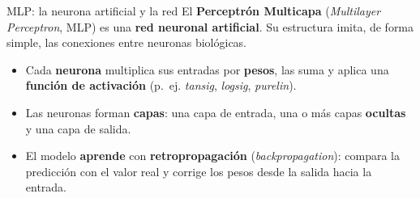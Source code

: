 \documentclass{beamer}
\begin{document}
\begin{frame}{MLP: la neurona artificial y la red}
    \justifying
    El \textbf{Perceptrón Multicapa} (\textit{Multilayer Perceptron}, MLP) es una \textbf{red neuronal artificial}. Su estructura imita, de forma simple, las conexiones entre neuronas biológicas.

    \begin{itemize}
        \item Cada \textbf{neurona} multiplica sus entradas por \textbf{pesos}, las suma y aplica una \textbf{función de activación} (p.~ej. \textit{tansig}, \textit{logsig}, \textit{purelin}).
        \item Las neuronas forman \textbf{capas}: una capa de entrada, una o más capas \textbf{ocultas} y una capa de salida.
        \item El modelo \textbf{aprende} con \textbf{retropropagación} (\textit{backpropagation}): compara la predicción con el valor real y corrige los pesos desde la salida hacia la entrada.
    \end{itemize}
\end{frame}
\end{document}
